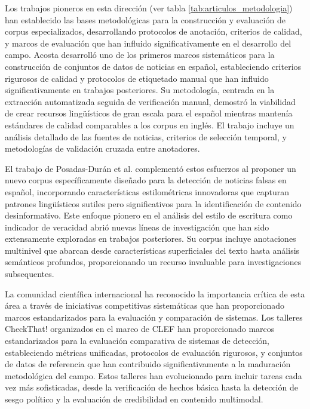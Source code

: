 Los trabajos pioneros en esta dirección (ver tabla \ref{tab:articulos_metodologia}) han establecido las bases metodológicas para la construcción y evaluación de corpus especializados, desarrollando protocolos de anotación, criterios de calidad, y marcos de evaluación que han influido significativamente en el desarrollo del campo. Acosta \cite{acosta2019construccion} desarrolló uno de los primeros marcos sistemáticos para la construcción de conjuntos de datos de noticias en español, estableciendo criterios rigurosos de calidad y protocolos de etiquetado manual que han influido significativamente en trabajos posteriores. Su metodología, centrada en la extracción automatizada seguida de verificación manual, demostró la viabilidad de crear recursos lingüísticos de gran escala para el español mientras mantenía estándares de calidad comparables a los corpus en inglés. El trabajo incluye un análisis detallado de las fuentes de noticias, criterios de selección temporal, y metodologías de validación cruzada entre anotadores.

El trabajo de Posadas-Durán et al. \cite{posadas2019detection} complementó estos esfuerzos al proponer un nuevo corpus específicamente diseñado para la detección de noticias falsas en español, incorporando características estilométricas innovadoras que capturan patrones lingüísticos sutiles pero significativos para la identificación de contenido desinformativo. Este enfoque pionero en el análisis del estilo de escritura como indicador de veracidad abrió nuevas líneas de investigación que han sido extensamente exploradas en trabajos posteriores. Su corpus incluye anotaciones multinivel que abarcan desde características superficiales del texto hasta análisis semánticos profundos, proporcionando un recurso invaluable para investigaciones subsequentes.

La comunidad científica internacional ha reconocido la importancia crítica de esta área a través de iniciativas competitivas sistemáticas que han proporcionado marcos estandarizados para la evaluación y comparación de sistemas. Los talleres CheckThat! organizados en el marco de CLEF \cite{alam2023overview, barron2023clef} han proporcionado marcos estandarizados para la evaluación comparativa de sistemas de detección, estableciendo métricas unificadas, protocolos de evaluación rigurosos, y conjuntos de datos de referencia que han contribuido significativamente a la maduración metodológica del campo. Estos talleres han evolucionado para incluir tareas cada vez más sofisticadas, desde la verificación de hechos básica hasta la detección de sesgo político y la evaluación de credibilidad en contenido multimodal.

